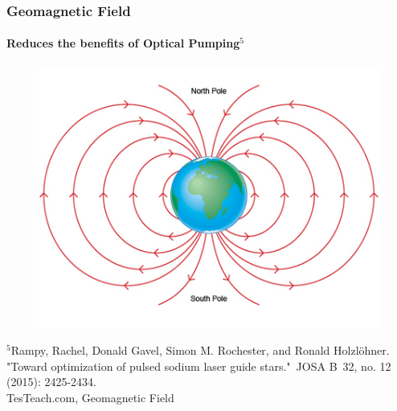 \documentclass{beamer}
\begin{document}
\begin{frame}
  \frametitle{Geomagnetic Field}
  \framesubtitle{Reduces the benefits of Optical Pumping$^{5}$}
  \centering
  \begin{figure}
		  \vspace{-.5cm}
	\includegraphics[scale = .5]{Images/magneticfield.jpg}
	\end{figure}
	\vspace{-1cm}
  {\tiny $^5$Rampy, Rachel, Donald Gavel, Simon M. Rochester, and Ronald Holzlöhner. "Toward optimization of pulsed sodium laser guide stars." JOSA B 32, no. 12 (2015): 2425-2434.}\\
  {\tiny TesTeach.com, Geomagnetic Field}

\end{frame}
\end{document}
